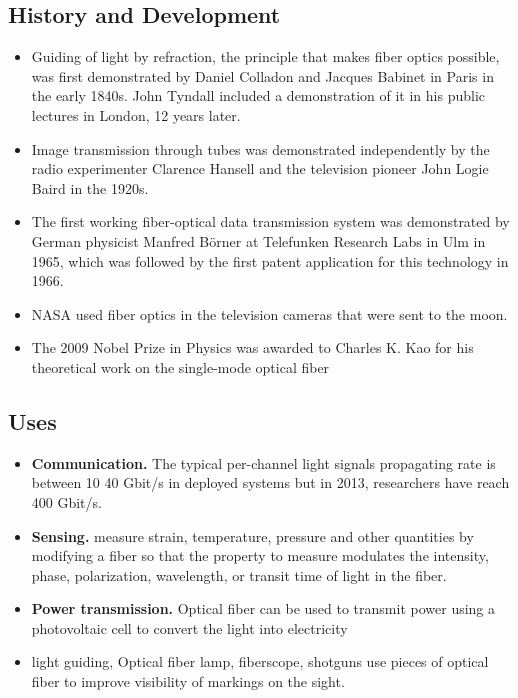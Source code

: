 \documentclass[twocolumn]{article}
\numberwithin{equation}{section}
\begin{document}
	\subsection{History and Development}
\begin{itemize}
	\item Guiding of light by refraction, the principle that makes fiber optics possible, was first demonstrated by Daniel Colladon and Jacques Babinet in Paris in the early 1840s. John Tyndall included a demonstration of it in his public lectures in London, 12 years later.
	\item Image transmission through tubes was demonstrated independently by the radio experimenter Clarence Hansell and the television pioneer John Logie Baird in the 1920s.
	\item The first working fiber-optical data transmission system was demonstrated by German physicist Manfred Börner at Telefunken Research Labs in Ulm in 1965, which was followed by the first patent application for this technology in 1966.
	\item NASA used fiber optics in the television cameras that were sent to the moon.
	\item The 2009 Nobel Prize in Physics was awarded to Charles K. Kao for his theoretical work on the single-mode optical fiber
\end{itemize}

	\subsection{Uses}
\begin{itemize}
	\item \textbf{Communication.} The typical per-channel light signals propagating rate is between 10 40 Gbit/s in deployed systems but in 2013, researchers have reach 400 Gbit/s.
	\item \textbf{Sensing.} measure strain, temperature, pressure and other quantities by modifying a fiber so that the property to measure modulates the intensity, phase, polarization, wavelength, or transit time of light in the fiber.
	\item \textbf{Power transmission.} Optical fiber can be used to transmit power using a photovoltaic cell to convert the light into electricity
	\item light guiding, Optical fiber lamp, fiberscope, shotguns use pieces of optical fiber to improve visibility of markings on the sight.
\end{itemize}
\end{document}
